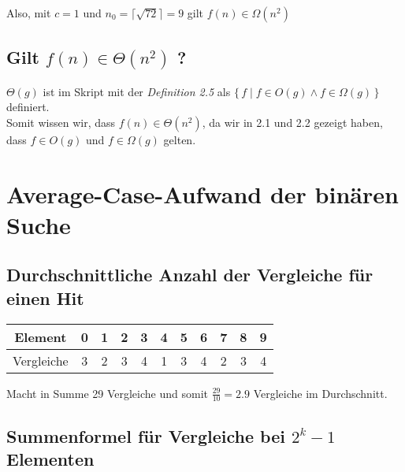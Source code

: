 \documentclass{article}
\begin{document}
\begin{flushleft}
	Also, mit $c = 1$ und $n_0 = \lceil\sqrt{72}\rceil = 9$ gilt $f(n) \in \Omega(n^2)$
\end{flushleft}


\subsection{Gilt $f(n) \in \Theta(n^2)$ ?}

$\Theta(g)$ ist im Skript mit der \emph{Definition 2.5} als $\{ \, f \mid f \in O(g) \wedge f \in \Omega(g) \, \}$ definiert.\\[0.5em]
Somit wissen wir, dass $f(n) \in \Theta(n^2)$, da wir in 2.1 und 2.2 gezeigt haben, dass $f \in O(g)$ und $f \in \Omega(g)$ gelten.

\section{Average-Case-Aufwand der binären Suche}

\subsection{Durchschnittliche Anzahl der Vergleiche für einen Hit}

\vspace{1em}

\begin{center}
	\begin{tabular}{|c|c|c|c|c|c|c|c|c|c|c|}
		\hline
		Element    & 0 & 1 & 2 & 3 & 4 & 5 & 6 & 7 & 8 & 9 \\
		\hline
		Vergleiche & 3 & 2 & 3 & 4 & 1 & 3 & 4 & 2 & 3 & 4 \\
		\hline
	\end{tabular}
\end{center}

\vspace{1em}

Macht in Summe 29 Vergleiche und somit $\frac{29}{10} = 2.9$ Vergleiche im Durchschnitt.

\subsection{Summenformel für Vergleiche bei $2^k - 1$ Elementen}
\end{document}
